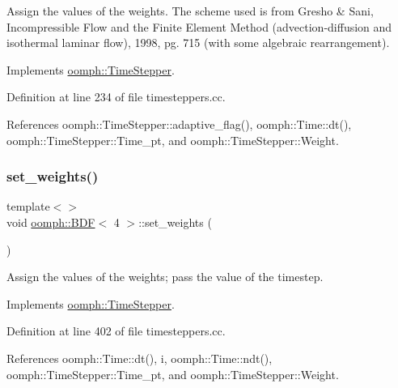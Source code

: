 Assign the values of the weights. The scheme used is from Gresho \& Sani, Incompressible Flow and the Finite Element Method (advection-\/diffusion and isothermal laminar flow), 1998, pg. 715 (with some algebraic rearrangement). 

Implements \hyperlink{classoomph_1_1TimeStepper_a028fa3a8d3c6db6b0ddf580cb0468d55}{oomph\+::\+Time\+Stepper}.



Definition at line 234 of file timesteppers.\+cc.



References oomph\+::\+Time\+Stepper\+::adaptive\+\_\+flag(), oomph\+::\+Time\+::dt(), oomph\+::\+Time\+Stepper\+::\+Time\+\_\+pt, and oomph\+::\+Time\+Stepper\+::\+Weight.

\mbox{\label{classoomph_1_1BDF_abaebf93da7392fb90a1f339e2717b4a7}} 
\subsubsection{\texorpdfstring{set\+\_\+weights()}{set\_weights()}\hspace{0.1cm}{\footnotesize\ttfamily [3/4]}}
{\footnotesize\ttfamily template$<$$>$ \\
void \hyperlink{classoomph_1_1BDF}{oomph\+::\+B\+DF}$<$ 4 $>$\+::set\+\_\+weights (\begin{DoxyParamCaption}{ }\end{DoxyParamCaption})\hspace{0.3cm}{\ttfamily [virtual]}}



Assign the values of the weights; pass the value of the timestep. 



Implements \hyperlink{classoomph_1_1TimeStepper_a028fa3a8d3c6db6b0ddf580cb0468d55}{oomph\+::\+Time\+Stepper}.



Definition at line 402 of file timesteppers.\+cc.



References oomph\+::\+Time\+::dt(), i, oomph\+::\+Time\+::ndt(), oomph\+::\+Time\+Stepper\+::\+Time\+\_\+pt, and oomph\+::\+Time\+Stepper\+::\+Weight.

\mbox{\label{classoomph_1_1BDF_a59cfd069cfa09e8b342cbf2d5234c7ce}} 

